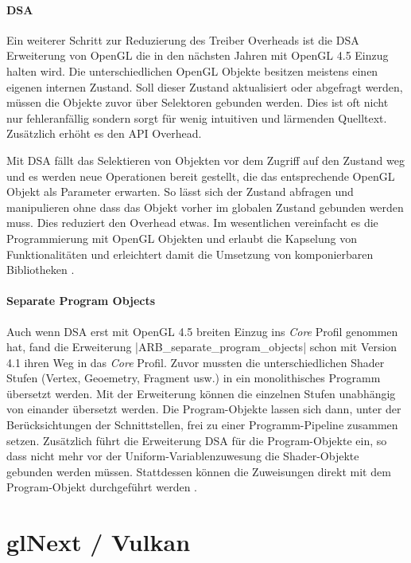 \paragraph{\acl{DSA}} Ein weiterer Schritt zur Reduzierung des Treiber Overheads ist die \ac{DSA} Erweiterung von OpenGL \parencite{Killgard2014} die in den nächsten Jahren mit OpenGL 4.5 Einzug halten wird. Die unterschiedlichen OpenGL Objekte besitzen meistens einen eigenen internen Zustand. Soll dieser Zustand aktualisiert oder abgefragt werden, müssen die Objekte zuvor über Selektoren gebunden werden. Dies ist oft nicht nur fehleranfällig sondern sorgt für wenig intuitiven und lärmenden Quelltext. Zusätzlich erhöht es den API Overhead. 

Mit \ac{DSA} fällt das Selektieren von Objekten vor dem Zugriff auf den Zustand weg und es werden neue Operationen bereit gestellt, die das entsprechende OpenGL Objekt als Parameter erwarten. So lässt sich der Zustand abfragen und manipulieren ohne dass das Objekt vorher im globalen Zustand gebunden werden muss. Dies reduziert den Overhead etwas. Im wesentlichen vereinfacht es die Programmierung mit OpenGL Objekten und erlaubt die Kapselung von Funktionalitäten und erleichtert damit die Umsetzung von komponierbaren Bibliotheken .

\paragraph{Separate Program Objects} Auch wenn \ac{DSA} erst mit OpenGL 4.5 breiten Einzug ins \textit{Core} Profil genommen hat, fand die Erweiterung |ARB_separate_program_objects| \parencite{Killgard2011} schon mit Version 4.1 ihren Weg in das \textit{Core} Profil. Zuvor mussten die unterschiedlichen Shader Stufen (Vertex, Geoemetry, Fragment usw.) in ein monolithisches Programm übersetzt werden. Mit der Erweiterung können die einzelnen Stufen unabhängig von einander übersetzt werden. Die Program-Objekte lassen sich dann, unter der Berücksichtungen der Schnittstellen, frei zu einer Programm-Pipeline zusammen setzen. Zusätzlich führt die Erweiterung \ac{DSA} für die Program-Objekte ein, so dass nicht mehr vor der Uniform-Variablenzuwesung die Shader-Objekte gebunden werden müssen. Stattdessen können die Zuweisungen direkt mit dem Program-Objekt durchgeführt werden .


\section{glNext / Vulkan}
\cite{gamedevnet:glnext}

